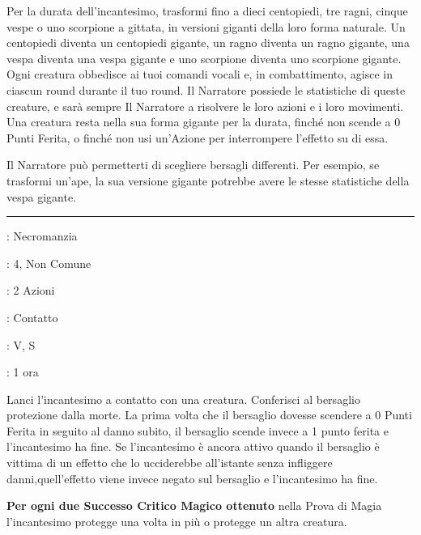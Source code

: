 \begin{multicols}{2}
Per la durata dell'incantesimo, trasformi fino a dieci centopiedi, tre ragni, cinque vespe o uno scorpione a gittata, in versioni giganti della loro forma naturale. Un centopiedi diventa un centopiedi gigante, un ragno diventa un ragno gigante, una vespa diventa una vespa gigante e uno scorpione diventa uno scorpione gigante. Ogni creatura obbedisce ai tuoi comandi vocali e, in combattimento, agisce in ciascun round durante il tuo round. Il Narratore possiede le statistiche di queste creature, e sarà sempre Il Narratore a risolvere le loro azioni e i loro movimenti. Una creatura resta nella sua forma gigante per la durata, finché non scende a 0 Punti Ferita, o finché non usi un'Azione per interrompere l'effetto su di essa.

Il Narratore può permetterti di scegliere bersagli differenti. Per esempio, se trasformi un'ape, la sua versione gigante potrebbe avere le stesse statistiche della vespa gigante.

\smallskip\noindent\rule{\linewidth}{2pt} \hypertarget{Interdizione alla Morte}{}\medskip{}
\noindent
\begin{description}[noitemsep, topsep=0pt, parsep=0pt, partopsep=0pt, leftmargin=0cm, labelwidth=2.8cm]
	\item[\textbf{Lista di Magia}]: Necromanzia
	\item[\textbf{Livello}]: 4, Non Comune
	\item[\textbf{T. di Lancio}]: 2 Azioni
	\item[\textbf{Gittata}]: Contatto
	\item[\textbf{Componenti}]: V, S
	\item[\textbf{Durata}]: 1 ora
\end{description}

Lanci l'incantesimo a contatto con una creatura. Conferisci al bersaglio protezione dalla morte. La prima volta che il bersaglio dovesse scendere a 0 Punti Ferita in seguito al danno subito, il bersaglio scende invece a 1 punto ferita e l'incantesimo ha fine. Se l'incantesimo è ancora attivo quando il bersaglio è vittima di un effetto che lo ucciderebbe all'istante senza infliggere danni,quell'effetto viene invece negato sul bersaglio e l'incantesimo ha fine.

\textbf{Per ogni due Successo Critico Magico ottenuto} nella Prova di Magia l'incantesimo protegge una volta in più o protegge un altra creatura.


\end{multicols}

